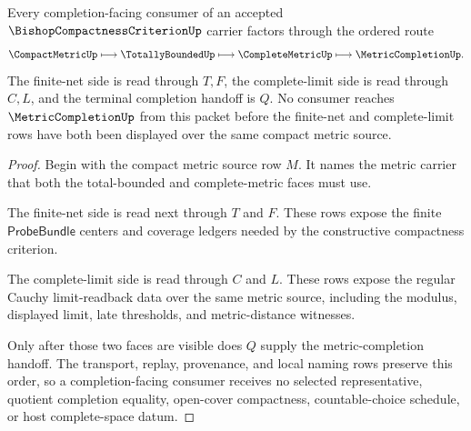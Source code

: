 \begin{theorem}
\label{thm:bishop-compactness-criterion-net-completion-handoff}
Every completion-facing consumer of an accepted $\BishopCompactnessCriterionUp$ carrier factors through the ordered route
$$
\CompactMetricUp \longmapsto \TotallyBoundedUp \longmapsto \CompleteMetricUp \longmapsto \MetricCompletionUp .
$$
The finite-net side is read through $T,F$, the complete-limit side is read through $C,L$, and the terminal completion handoff is $Q$. No consumer reaches $\MetricCompletionUp$ from this packet before the finite-net and complete-limit rows have both been displayed over the same compact metric source.
\end{theorem}
\begin{proof}
Begin with the compact metric source row $M$. It names the metric carrier that both the total-bounded and complete-metric faces must use.

The finite-net side is read next through $T$ and $F$. These rows expose the finite $\mathsf{ProbeBundle}$ centers and coverage ledgers needed by the constructive compactness criterion.

The complete-limit side is read through $C$ and $L$. These rows expose the regular Cauchy limit-readback data over the same metric source, including the modulus, displayed limit, late thresholds, and metric-distance witnesses.

Only after those two faces are visible does $Q$ supply the metric-completion handoff. The transport, replay, provenance, and local naming rows preserve this order, so a completion-facing consumer receives no selected representative, quotient completion equality, open-cover compactness, countable-choice schedule, or host complete-space datum.
\end{proof}

